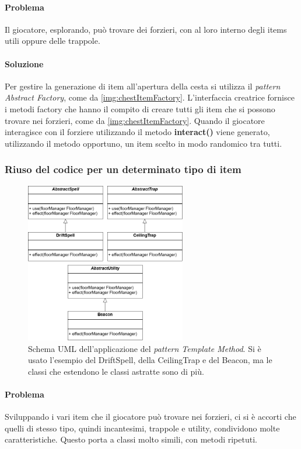 \documentclass{report}
\begin{document}
\paragraph{Problema} Il giocatore, esplorando, può trovare dei forzieri, con al loro interno degli items utili oppure delle trappole. 

\paragraph{Soluzione} Per gestire la generazione di item all'apertura della cesta si utilizza il \textit{pattern Abstract Factory}, come da \ref{img:chestItemFactory}.
%
L'interfaccia creatrice fornisce i metodi factory che hanno il compito di creare tutti gli item che si possono trovare nei forzieri, come da \ref{img:chestItemFactory}. 
%
Quando il giocatore interagisce con il forziere utilizzando il metodo \textbf{interact()} viene generato, utilizzando il metodo opportuno, un item scelto in modo randomico tra tutti.

\subsubsection{Riuso del codice per un determinato tipo di item}

\begin{figure}
    \centering
    \includegraphics[width=7cm]{patternTemplateItem.drawio.png}
    \caption{Schema UML dell'applicazione del \textit{pattern Template Method}. Si è usato l'esempio del DriftSpell, della CeilingTrap e del Beacon, ma le classi che estendono le classi astratte sono di più.}
    \label{img:templateItem}
\end{figure}

\paragraph{Problema} Sviluppando i vari item che il giocatore può trovare nei forzieri, ci si è accorti che quelli di stesso tipo, quindi incantesimi, trappole e utility, condividono molte caratteristiche.
%
Questo porta a classi molto simili, con metodi ripetuti. 
\end{document}
